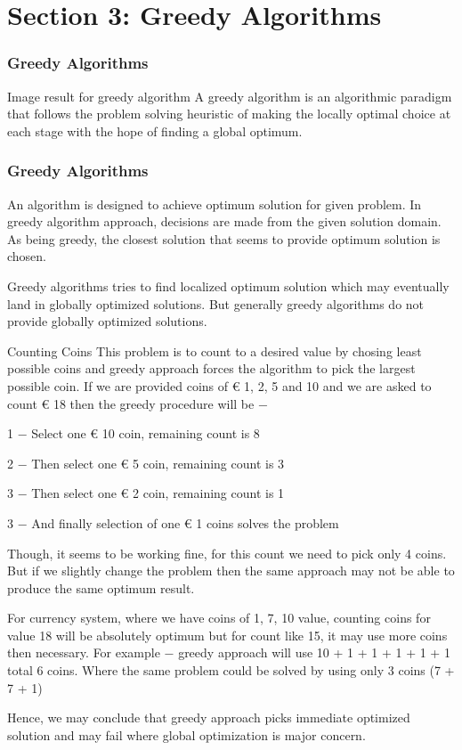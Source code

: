 \documentclass{beamer}
\begin{document}
\section{Section 3: Greedy Algorithms}
\begin{frame}
\frametitle{Greedy Algorithms}
\large

Image result for greedy algorithm
A greedy algorithm is an algorithmic paradigm that follows the problem solving heuristic of making the locally optimal choice at each stage with the hope of finding a global optimum.
\end{frame}
\begin{frame}
\frametitle{Greedy Algorithms}
\large
An algorithm is designed to achieve optimum solution for given problem. In greedy algorithm approach, decisions are made from the given solution domain. As being greedy, the closest solution that seems to provide optimum solution is chosen.

Greedy algorithms tries to find localized optimum solution which may eventually land in globally optimized solutions. But generally greedy algorithms do not provide globally optimized solutions.
\end{frame}
\begin{frame}
Counting Coins
This problem is to count to a desired value by chosing least possible coins and greedy approach forces the algorithm to pick the largest possible coin. If we are provided coins of € 1, 2, 5 and 10 and we are asked to count € 18 then the greedy procedure will be −

1 − Select one € 10 coin, remaining count is 8

2 − Then select one € 5 coin, remaining count is 3

3 − Then select one € 2 coin, remaining count is 1

3 − And finally selection of one € 1 coins solves the problem
\end{frame}
\begin{frame}

Though, it seems to be working fine, for this count we need to pick only 4 coins. But if we slightly change the problem then the same approach may not be able to produce the same optimum result.

For currency system, where we have coins of 1, 7, 10 value, counting coins for value 18 will be absolutely optimum but for count like 15, it may use more coins then necessary. For example − greedy approach will use 10 + 1 + 1 + 1 + 1 + 1 total 6 coins. Where the same problem could be solved by using only 3 coins (7 + 7 + 1)

Hence, we may conclude that greedy approach picks immediate optimized solution and may fail where global optimization is major concern.
\end{frame}
\end{document}
